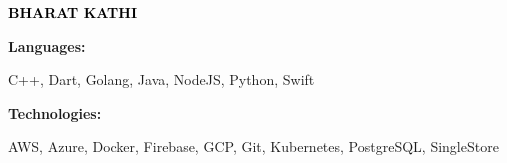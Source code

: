 \documentclass[9pt]{developercv} %
\begin{document}

\begin{minipage}[t]{0.5\textwidth} 
	\vspace{-\baselineskip} %
	
	{ \fontsize{16}{20} \textcolor{black}{\textbf{\MakeUppercase{Bharat Kathi}}}} %
	
	\vspace{6pt}
    \hspace{22pt}

    \hspace{12pt}
    
\end{minipage}
\hfill
\begin{minipage}[t]{0.5\textwidth}
    \vspace{-18pt}
    \vspace{-6pt}
    
    \begin{minipage}[t]{0.2\textwidth}
        \textbf{Languages:}
    \end{minipage}
    \hfill
    \begin{minipage}[t]{0.73\textwidth}
        C++, Dart, Golang, Java, NodeJS, Python, Swift
    \end{minipage}
    \vspace{4mm}
    
    \begin{minipage}[t]{0.2\textwidth}
        \textbf{Technologies:}
    \end{minipage}
    \hfill
    \begin{minipage}[t]{0.73\textwidth}
        AWS, Azure, Docker, Firebase, GCP, Git, Kubernetes, PostgreSQL, SingleStore
    \end{minipage}
    
\end{minipage}
\end{document}
